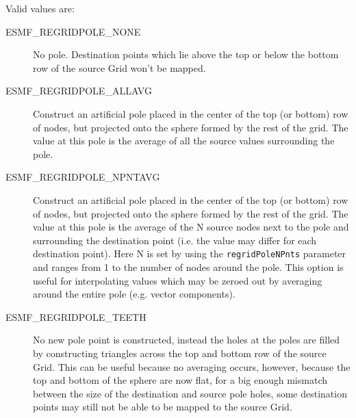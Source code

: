 Valid values are:
\begin{description}
\item [ESMF\_REGRIDPOLE\_NONE]
      No pole. Destination points which lie above the top or below the bottom row of the source Grid won't be mapped. 
\item [ESMF\_REGRIDPOLE\_ALLAVG]
      Construct an artificial pole placed in the center of the top (or bottom) row of nodes, but projected onto the sphere formed by the rest of the grid. The value at this pole is the average of all the source values surrounding the pole.
\item [ESMF\_REGRIDPOLE\_NPNTAVG] Construct an artificial pole placed in the center of the top (or bottom) row of nodes, but projected onto the sphere formed by the rest of the grid. The value at this pole is the average of the N source nodes next to the pole and surrounding the destination point (i.e. the value may differ for each destination point). Here N is set by using the {\tt regridPoleNPnts} parameter and ranges from 1 to the number of nodes around the pole. This option is useful for interpolating values which may be zeroed out by averaging around the entire pole (e.g. vector components). 
\item [ESMF\_REGRIDPOLE\_TEETH]
    No new pole point is constructed, instead the holes at the poles are filled by constructing triangles across the top and bottom row of the source Grid. This can be useful because no averaging occurs, however, because the top and bottom of the sphere are now flat, for a big enough mismatch between the size of the destination and source pole holes, some destination points may still not be able to be mapped to the source Grid. 

\end{description}



